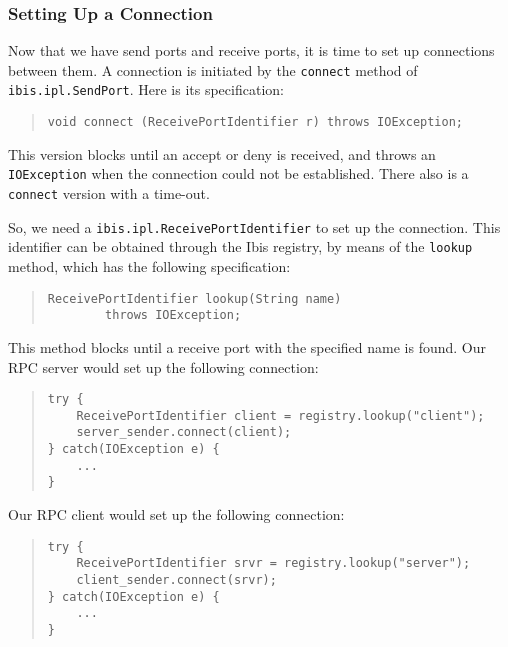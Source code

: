\documentclass[10pt]{article}
\begin{document}
\subsubsection{Setting Up a Connection}

Now that we have send ports and receive ports, it is time to set up
connections between them.
A connection is initiated by the \verb+connect+ method of
\verb+ibis.ipl.SendPort+.
Here is its specification:

\begin{quote}
\begin{verbatim}
void connect (ReceivePortIdentifier r) throws IOException;
\end{verbatim}
\end{quote}

This version blocks until an accept or deny is received, and throws
an \verb+IOException+ when the connection could not be established.
There also is a \verb+connect+ version with a time-out.

So, we need a \verb+ibis.ipl.ReceivePortIdentifier+ to set up the
connection.
This identifier can be obtained through the Ibis registry, by
means of the \verb+lookup+ method, which has the following specification:

\begin{quote}
\begin{verbatim}
ReceivePortIdentifier lookup(String name)
        throws IOException;
\end{verbatim}
\end{quote}

This method blocks until a receive port with the specified name is found.
Our RPC server would set up the following connection:

\begin{quote}
\begin{verbatim}
try {
    ReceivePortIdentifier client = registry.lookup("client");
    server_sender.connect(client);
} catch(IOException e) {
    ...
}
\end{verbatim}
\end{quote}

Our RPC client would set up the following connection:

\begin{quote}
\begin{verbatim}
try {
    ReceivePortIdentifier srvr = registry.lookup("server");
    client_sender.connect(srvr);
} catch(IOException e) {
    ...
}
\end{verbatim}
\end{quote}
\end{document}
